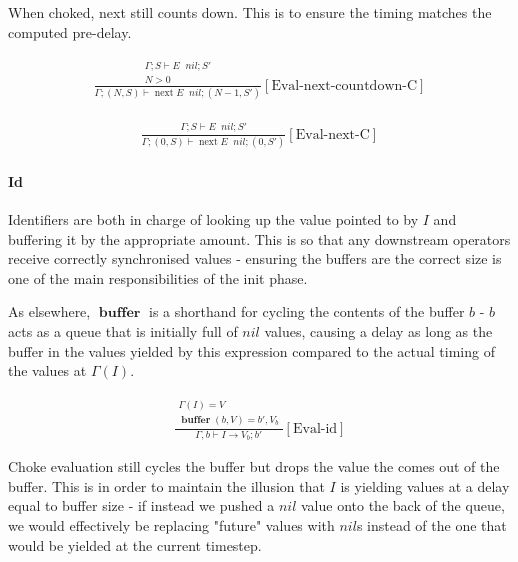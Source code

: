\documentclass{scrartcl}
\DeclareMathOperator{\nextop}{next}
\DeclareMathOperator{\ceval}{\overset{C}{\rightarrow}}
\DeclareMathOperator{\buffer}{\mathbf{buffer}}
\begin{document}
    When choked, next still counts down. This is to ensure the timing matches the computed pre-delay.
    
    \begin{align*}
    \frac{
        \begin{matrix}
        \Gamma; S \vdash E \ceval nil; S' \\
        N > 0
        \end{matrix}
    }{
        \Gamma; (N, S) \vdash \nextop E \ceval nil; (N-1, S')
    }[\text{Eval-next-countdown-C}]
    \end{align*}
    
    \begin{align*}
    \frac{
        \begin{matrix}
        \Gamma; S \vdash E \ceval nil; S'
        \end{matrix}
    }{
        \Gamma; (0, S) \vdash \nextop E \ceval nil; (0, S')
    }[\text{Eval-next-C}]
    \end{align*}
    
    \paragraph{Id}
    
    Identifiers are both in charge of looking up the value pointed to by $I$ and buffering it by the appropriate amount. This is so that any downstream operators receive correctly synchronised values - ensuring the buffers are the correct size is one of the main responsibilities of the init phase.
    
    As elsewhere, $\buffer$ is a shorthand for cycling the contents of the buffer $b$ - $b$ acts as a queue that is initially full of $nil$ values, causing a delay as long as the buffer in the values yielded by this expression compared to the actual timing of the values at $\Gamma(I)$.
    
    \begin{align*}
    \frac{
        \begin{matrix}
        \Gamma(I) = V \\
        \buffer(b, V) = b', V_b
        \end{matrix}
    }{
        \Gamma, b \vdash I \rightarrow V_b; b'
    }[\text{Eval-id}]
    \end{align*}
    
    Choke evaluation still cycles the buffer but drops the value the comes out of the buffer. This is in order to maintain the illusion that $I$ is yielding values at a delay equal to buffer size - if instead we pushed a $nil$ value onto the back of the queue, we would effectively be replacing "future" values with $nil$s instead of the one that would be yielded at the current timestep.
    
\end{document}
